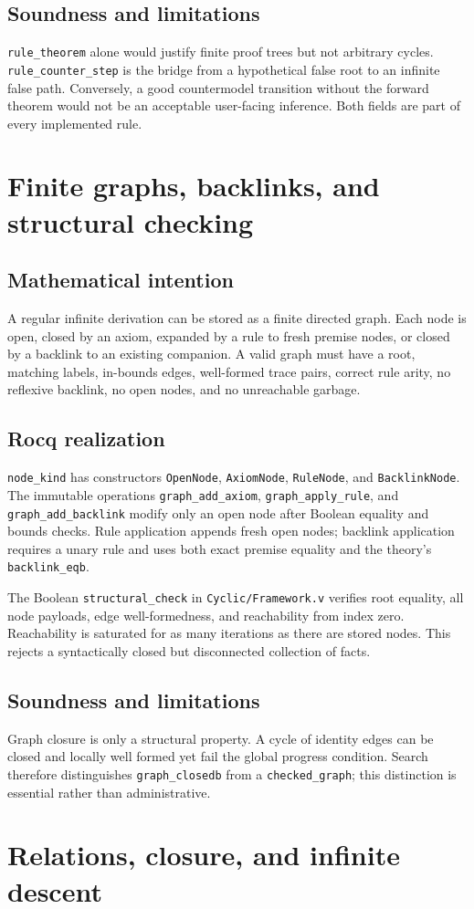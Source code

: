 \documentclass[11pt,oneside]{book}
\DeclareRobustCommand{\code}[1]{\nolinkurl{#1}}
\DeclareRobustCommand{\file}[1]{\nolinkurl{#1}}
\newcommand{\src}[2]{\code{#2} in \file{#1}}
\newcommand{\mathintent}{\subsection*{Mathematical intention}}
\newcommand{\rocqreal}{\subsection*{Rocq realization}}
\newcommand{\soundlim}{\subsection*{Soundness and limitations}}
\begin{document}
\soundlim

\code{rule_theorem} alone would justify finite proof trees but not arbitrary
cycles.  \code{rule_counter_step} is the bridge from a hypothetical false root
to an infinite false path.  Conversely, a good countermodel transition without
the forward theorem would not be an acceptable user-facing inference.  Both
fields are part of every implemented rule.

\section{Finite graphs, backlinks, and structural checking}

\mathintent

A regular infinite derivation can be stored as a finite directed graph.  Each
node is open, closed by an axiom, expanded by a rule to fresh premise nodes, or
closed by a backlink to an existing companion.  A valid graph must have a root,
matching labels, in-bounds edges, well-formed trace pairs, correct rule arity,
no reflexive backlink, no open nodes, and no unreachable garbage.

\rocqreal

\code{node_kind} has constructors \code{OpenNode}, \code{AxiomNode},
\code{RuleNode}, and \code{BacklinkNode}.  The immutable operations
\code{graph_add_axiom}, \code{graph_apply_rule}, and
\code{graph_add_backlink} modify only an open node after Boolean equality and
bounds checks.  Rule application appends fresh open nodes; backlink application
requires a unary rule and uses both exact premise equality and the theory's
\code{backlink_eqb}.

The Boolean \src{Cyclic/Framework.v}{structural_check} verifies root equality,
all node payloads, edge well-formedness, and reachability from index zero.
Reachability is saturated for as many iterations as there are stored nodes.
This rejects a syntactically closed but disconnected collection of facts.

\soundlim

Graph closure is only a structural property.  A cycle of identity edges can be
closed and locally well formed yet fail the global progress condition.  Search
therefore distinguishes \code{graph_closedb} from a \code{checked_graph}; this
distinction is essential rather than administrative.

\section{Relations, closure, and infinite descent}
\end{document}
